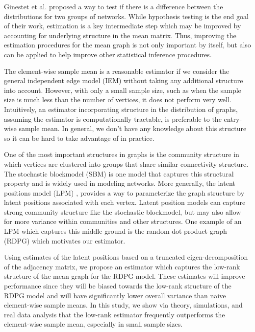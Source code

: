 \documentclass[10pt,letterpaper]{article}
\begin{document}
Ginestet et al. \cite{ginestet2014hypothesis} proposed a way to test if there is a difference between the distributions for two groups of networks.  
While hypothesis testing is the end goal of their work, estimation is a key intermediate step which may be improved by accounting for underlying structure in the mean matrix. 
Thus, improving the estimation procedures for the mean graph is not only important by itself, but also can be applied to help improve other statistical inference procedures.

The element-wise sample mean is a reasonable estimator if we consider the general independent edge model (IEM) \cite{bollobas2007phase} without taking any additional structure into account. 
However, with only a small sample size, such as when the sample size is much less than the number of vertices, it does not perform very well.
Intuitively, an estimator incorporating structure in the distribution of graphs, assuming the estimator is computationally tractable, is preferable to the entry-wise sample mean. 
In general, we don't have any knowledge about this structure so it can be hard to take advantage of in practice.



One of the most important structures in graphs is the community structure in which vertices are clustered into groups that share similar connectivity structure. The stochastic blockmodel (SBM) \cite{holland1983stochastic} is one model that captures this structural property and is widely used in modeling networks.
More generally, the latent positions model (LPM) \cite{hoff2002latent}, provides a way to parameterize the graph structure by latent positions associated with each vertex. 
Latent position models can capture strong community structure like the stochastic blockmodel, but may also allow for more variance within communities and other structures.
One example of an LPM which captures this middle ground is the random dot product graph (RDPG) \cite{young2007random, nickel2007random} which motivates our estimator. 

Using estimates of the latent positions based on a truncated eigen-decomposition of the adjacency matrix, we propose an estimator which captures the low-rank structure of the mean graph for the RDPG model.
These estimates will improve performance since they will be biased towards the low-rank structure of the RDPG model and will have significantly lower overall variance than naive element-wise sample means.
In this study, we show via theory, simulations, and real data analysis that the low-rank estimator frequently outperforms the element-wise sample mean, especially in small sample sizes.
\end{document}
